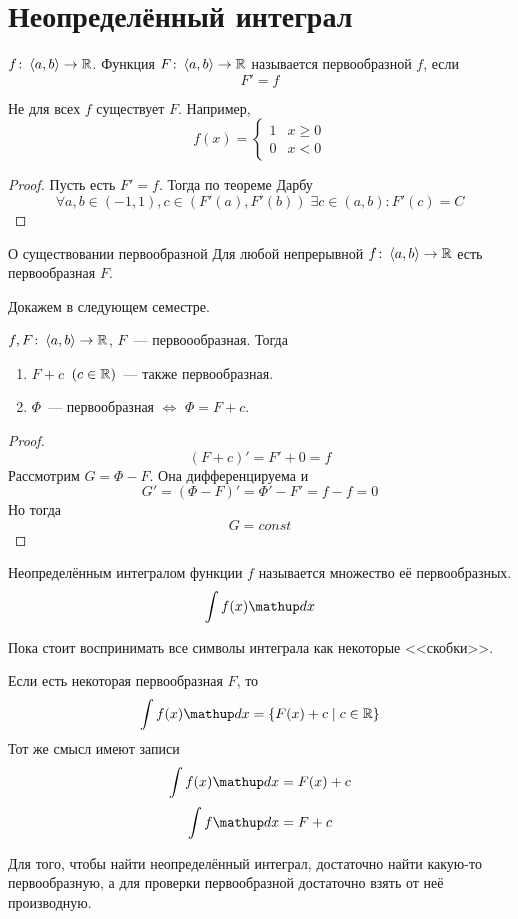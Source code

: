 ﻿
\section{Неопределённый интеграл}

\begin{Def}
$f\colon \left<a, b\right> \rightarrow \mathbb{R}$. Функция $F\colon \left<a, b\right> \rightarrow \mathbb{R}$ называется первообразной $f$, если
$$F' = f$$
\end{Def}

Не для всех $f$ существует $F$. Например,
$$f(x) = \begin{cases}1 & x \geqslant 0 \\ 0 & x < 0\end{cases}$$
\begin{proof}
Пусть есть $F' = f$. Тогда по теореме Дарбу
$$\forall a, b \in (-1, 1), c \in (F'(a), F'(b))\; \exists c \in (a, b)\colon F'(c) = C$$
\end{proof}

\begin{theorem}{О существовании первообразной}
Для любой непрерывной $f\colon \left<a, b\right> \rightarrow \mathbb{R}$ есть первообразная $F$.
\end{theorem}
Докажем в следующем семестре.

\begin{theorem}{}
$f, F\colon \left<a, b\right> \rightarrow \mathbb{R}$, $F$~--- первоообразная. Тогда
\begin{enumerate}
\item $F + c$~$(c \in \mathbb{R})$~--- также первообразная.
\item $\Phi$~--- первообразная $\iff$ $\Phi = F + c$.
\end{enumerate}
\end{theorem}
\begin{proof}
$$(F+c)' = F' + 0 = f$$
Рассмотрим $G = \Phi - F$. Она дифференцируема и
$$G' = (\Phi - F)' = \Phi' - F' = f - f = 0$$
Но тогда $$G = const$$
\end{proof}

\begin{Def}
Неопределённым интегралом функции $f$ называется множество её первообразных.
$$\int f(x)\d x$$
\end{Def}
Пока стоит воспринимать все символы интеграла как некоторые <<скобки>>.

Если есть некоторая первообразная $F$, то
$$\int f(x)\d x = \left\{F(x) + c \mid c \in \R\right\}$$
Тот же смысл имеют записи
$$\int f(x)\d x = F(x) + c$$
$$\int f\d x = F + c$$

Для того, чтобы найти неопределённый интеграл, достаточно найти какую-то первообразную, а для проверки первообразной достаточно взять от неё производную.
